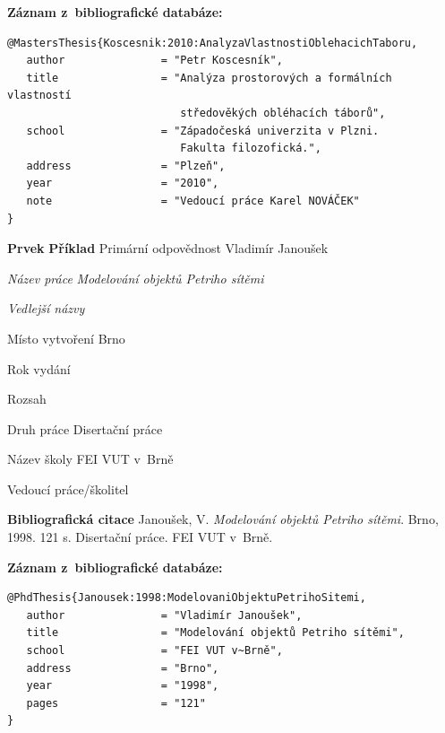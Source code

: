 \bigskip \bigskip
\noindent \textbf{Záznam z~bibliografické databáze:}
\vspace{-0.5em}
\begin{verbatim}
@MastersThesis{Koscesnik:2010:AnalyzaVlastnostiOblehacichTaboru,
   author               = "Petr Koscesník",
   title                = "Analýza prostorových a formálních vlastností 
                           středověkých obléhacích táborů",
   school               = "Západočeská univerzita v Plzni. 
                           Fakulta filozofická.",
   address              = "Plzeň",
   year                 = "2010",
   note                 = "Vedoucí práce Karel NOVÁČEK"
}
\end{verbatim}


\newpage
\label{pr-akademicka-prace2}
\begin{tabbing} 
\zarazky
\textbf{Prvek} \> \textbf{Příklad} \odradkovani
Primární odpovědnost \>
Vladimír {\sc Janoušek}

\odradkovani
{\em Název práce} \>
{\em Modelování objektů Petriho sítěmi}

\odradkovani
{\em Vedlejší názvy}\footnotemark[1]

\odradkovani
Místo vytvoření \>
Brno

\odradkovani
Rok vydání 

\odradkovani
Rozsah\footnotemark[1] 

\odradkovani
Druh práce \>
Disertační práce

\odradkovani
Název školy \>
FEI VUT v~Brně

\odradkovani
Vedoucí práce/školitel\footnotemark[1]\>

\odradkovani
\end{tabbing}

\noindent \textbf{Bibliografická citace} \odradkovani
{\sc Janoušek}, V. {\em Modelování objektů Petriho sítěmi}. Brno, 1998. 121 s. Disertační práce. FEI VUT v~Brně.

\bigskip \bigskip
\noindent \textbf{Záznam z~bibliografické databáze:}
\vspace{-0.5em}
\begin{verbatim}
@PhdThesis{Janousek:1998:ModelovaniObjektuPetrihoSitemi,
   author               = "Vladimír Janoušek",
   title                = "Modelování objektů Petriho sítěmi",
   school               = "FEI VUT v~Brně",
   address              = "Brno",
   year                 = "1998",
   pages                = "121"
}
\end{verbatim}

